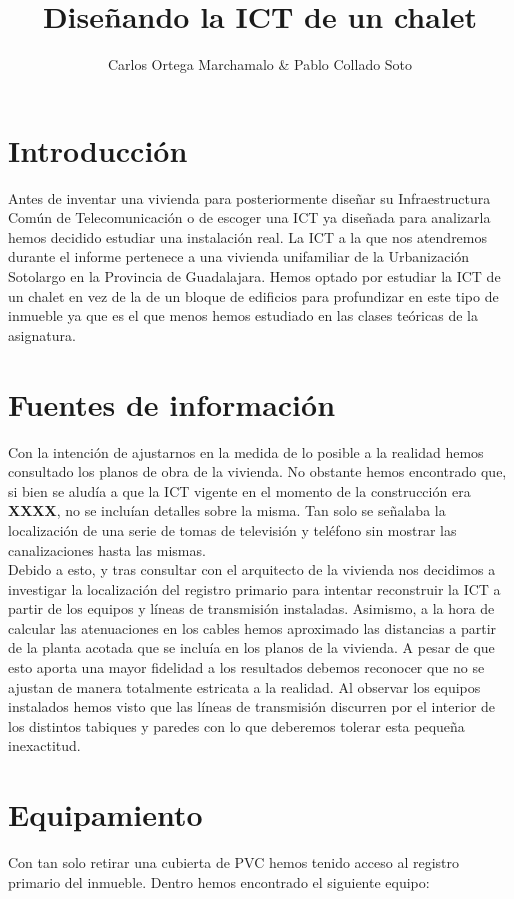 \documentclass{article}[12 pt]
\title{Diseñando la ICT de un chalet}
\author{Carlos Ortega Marchamalo \& Pablo Collado Soto}
\date{}
\begin{document}
	\maketitle

	\section{Introducción}
		Antes de inventar una vivienda para posteriormente diseñar su Infraestructura Común de Telecomunicación o de escoger una ICT ya diseñada para analizarla hemos decidido estudiar una instalación real. La ICT a la que nos atendremos durante el informe pertenece a una vivienda unifamiliar de la Urbanización Sotolargo en la Provincia de Guadalajara. Hemos optado por estudiar la ICT de un chalet en vez de la de un bloque de edificios para profundizar en este tipo de inmueble ya que es el que menos hemos estudiado en las clases teóricas de la asignatura.
	\section{Fuentes de información}
		Con la intención de ajustarnos en la medida de lo posible a la realidad hemos consultado los planos de obra de la vivienda. No obstante hemos encontrado que, si bien se aludía a que la ICT vigente en el momento de la construcción era \textbf{XXXX}, no se incluían detalles sobre la misma. Tan solo se señalaba la localización de una serie de tomas de televisión y teléfono sin mostrar las canalizaciones hasta las mismas.
		\\
		Debido a esto, y tras consultar con el arquitecto de la vivienda nos decidimos a investigar la localización del registro primario para intentar reconstruir la ICT a partir de los equipos y líneas de transmisión instaladas. Asimismo, a la hora de calcular las atenuaciones en los cables hemos aproximado las distancias a partir de la planta acotada que se incluía en los planos de la vivienda. A pesar de que esto aporta una mayor fidelidad a los resultados debemos reconocer que no se ajustan de manera totalmente estricata a la realidad. Al observar los equipos instalados hemos visto que las líneas de transmisión discurren por el interior de los distintos tabiques y paredes con lo que deberemos tolerar esta pequeña inexactitud.
	\section{Equipamiento}
		Con tan solo retirar una cubierta de PVC hemos tenido acceso al registro primario del inmueble. Dentro hemos encontrado el siguiente equipo:
\end{document}
